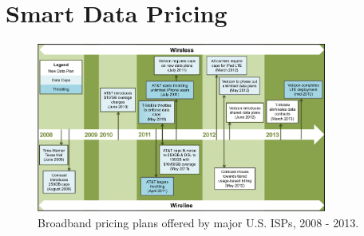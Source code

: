 \section{Smart Data Pricing}\label{SDP}



 \begin{figure}
\centering
\includegraphics[width = 0.85\textwidth]{Figures/Timeline.pdf}
\vspace{-0.1in}
\caption{Broadband pricing plans offered by major U.S. ISPs, 2008 - 2013.}
\label{fig:timeline}
\vspace{-0.05in}
\end{figure}

